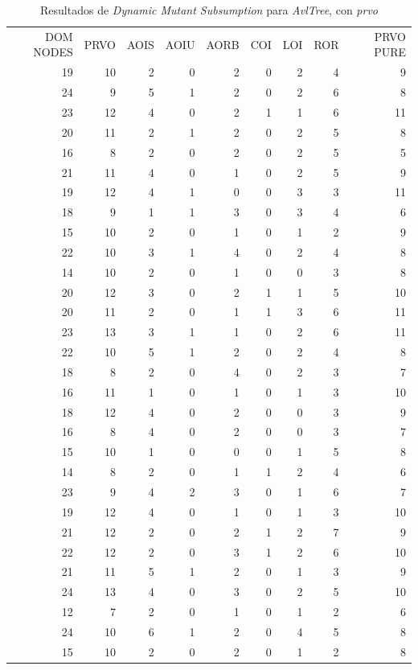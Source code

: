 \begin{table}[]
	\caption{Resultados de \emph{Dynamic Mutant Subsumption} para \emph{AvlTree}, con \emph{prvo}}
	\label{tables.results.subsumption.avltree.prvo}
	\centering
	\scriptsize
	\def\arraystretch{0.95}
	\setlength\tabcolsep{0.5mm}
	\begin{tabular}{rrrrrrrrr}
		DOM NODES & PRVO & AOIS & AOIU & AORB & COI & LOI & ROR & PRVO PURE \\
		19 & 10 & 2 & 0 & 2 & 0 & 2 & 4 & 9 \\
		24 & 9 & 5 & 1 & 2 & 0 & 2 & 6 & 8 \\
		23 & 12 & 4 & 0 & 2 & 1 & 1 & 6 & 11 \\
		20 & 11 & 2 & 1 & 2 & 0 & 2 & 5 & 8 \\
		16 & 8 & 2 & 0 & 2 & 0 & 2 & 5 & 5 \\
		21 & 11 & 4 & 0 & 1 & 0 & 2 & 5 & 9 \\
		19 & 12 & 4 & 1 & 0 & 0 & 3 & 3 & 11 \\
		18 & 9 & 1 & 1 & 3 & 0 & 3 & 4 & 6 \\
		15 & 10 & 2 & 0 & 1 & 0 & 1 & 2 & 9 \\
		22 & 10 & 3 & 1 & 4 & 0 & 2 & 4 & 8 \\
		14 & 10 & 2 & 0 & 1 & 0 & 0 & 3 & 8 \\
		20 & 12 & 3 & 0 & 2 & 1 & 1 & 5 & 10 \\
		20 & 11 & 2 & 0 & 1 & 1 & 3 & 6 & 11 \\
		23 & 13 & 3 & 1 & 1 & 0 & 2 & 6 & 11 \\
		22 & 10 & 5 & 1 & 2 & 0 & 2 & 4 & 8 \\
		18 & 8 & 2 & 0 & 4 & 0 & 2 & 3 & 7 \\
		16 & 11 & 1 & 0 & 1 & 0 & 1 & 3 & 10 \\
		18 & 12 & 4 & 0 & 2 & 0 & 0 & 3 & 9 \\
		16 & 8 & 4 & 0 & 2 & 0 & 0 & 3 & 7 \\
		15 & 10 & 1 & 0 & 0 & 0 & 1 & 5 & 8 \\
		14 & 8 & 2 & 0 & 1 & 1 & 2 & 4 & 6 \\
		23 & 9 & 4 & 2 & 3 & 0 & 1 & 6 & 7 \\
		19 & 12 & 4 & 0 & 1 & 0 & 1 & 3 & 10 \\
		21 & 12 & 2 & 0 & 2 & 1 & 2 & 7 & 9 \\
		22 & 12 & 2 & 0 & 3 & 1 & 2 & 6 & 10 \\
		21 & 11 & 5 & 1 & 2 & 0 & 1 & 3 & 9 \\
		24 & 13 & 4 & 0 & 3 & 0 & 2 & 5 & 10 \\
		12 & 7 & 2 & 0 & 1 & 0 & 1 & 2 & 6 \\
		24 & 10 & 6 & 1 & 2 & 0 & 4 & 5 & 8 \\
		15 & 10 & 2 & 0 & 2 & 0 & 1 & 2 & 8
	\end{tabular}
\end{table}


